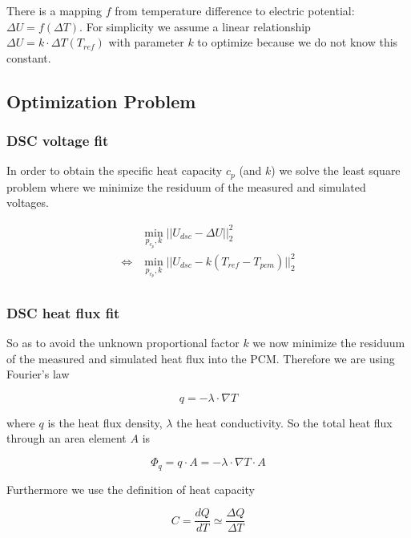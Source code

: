 \documentclass{scrartcl}[12pt, halfparskip]
\begin{document}
There is a mapping $f$ from temperature difference to electric potential: $\Delta U = f(\Delta T)$.
For simplicity we assume a linear relationship $\Delta U = k \cdot \Delta T(T_{ref})$ with parameter $k$ to optimize because we do not know this constant. \\

\subsection{Optimization Problem}
\subsubsection{DSC voltage fit}

In order to obtain the specific heat capacity $c_p$ (and $k$) we solve the least square problem where we minimize the residuum of the measured and simulated voltages.

\begin{align*}
	& \min_{p_{c_p}, k} ||U_{dsc} - \Delta U ||_2^2 \\
	\Leftrightarrow & \min_{p_{c_p}, k} ||U_{dsc} - k (T_{ref} - T_{pcm}) ||_2^2 \\
\end{align*}


\subsubsection{DSC heat flux fit}
So as to avoid the unknown proportional factor $k$ we now minimize the residuum of the measured and simulated heat flux into the PCM. Therefore we are using Fourier's law

\begin{equation}
	q = - \lambda \cdot \nabla T
\end{equation}
\label{eq:def_fouriers_law}

where $q$ is the heat flux density, $\lambda$ the heat conductivity. So the total heat flux through an area element $A$ is

\begin{equation*}
	\Phi_q = q \cdot A =  - \lambda \cdot \nabla T \cdot A
\end{equation*}

Furthermore we use the definition of heat capacity

\begin{equation}
	C = \frac{dQ}{dT} \simeq \frac{\Delta Q}{\Delta T}
\end{equation}
\label{eq:def_heat_capacity}
\end{document}
